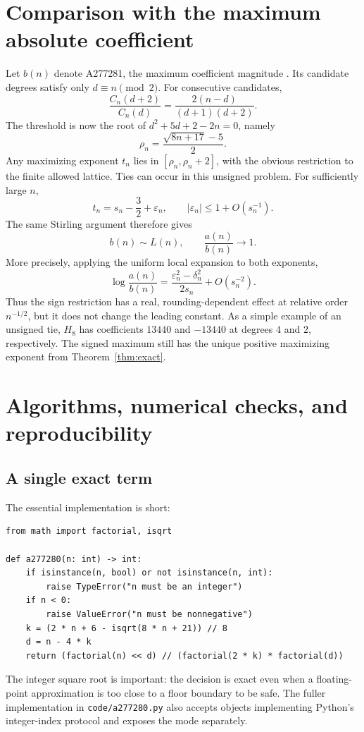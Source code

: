 \documentclass[11pt,letterpaper]{article}
\theoremstyle{remark}
\begin{document}
\section{Comparison with the maximum absolute coefficient}\label{sec:absolute}

Let $b(n)$ denote A277281, the maximum coefficient magnitude
\cite{oeis281}. Its candidate degrees satisfy only $d\equiv n\pmod2$.
For consecutive candidates,
\begin{equation}\label{eq:tworatio}
 \frac{C_n(d+2)}{C_n(d)}
 =\frac{2(n-d)}{(d+1)(d+2)}.
\end{equation}
The threshold is now the root of $d^2+5d+2-2n=0$, namely
\[
 \rho_n=\frac{\sqrt{8n+17}-5}{2}.
\]
Any maximizing exponent $t_n$ lies in $[\rho_n,\rho_n+2]$, with the obvious
restriction to the finite allowed lattice. Ties can occur in this unsigned
problem. For sufficiently large $n$,
\[
 t_n=s_n-\frac32+\varepsilon_n,\qquad
 |\varepsilon_n|\le1+O(s_n^{-1}).
\]
The same Stirling argument therefore gives
\begin{equation}\label{eq:unsigned}
 b(n)\sim L(n),\qquad
 \frac{a(n)}{b(n)}\longrightarrow1.
\end{equation}
More precisely, applying the uniform local expansion to both exponents,
\begin{equation}\label{eq:signedunsigned}
 \log\frac{a(n)}{b(n)}
 =\frac{\varepsilon_n^2-\delta_n^2}{2s_n}+O(s_n^{-2}).
\end{equation}
Thus the sign restriction has a real, rounding-dependent effect at relative
order $n^{-1/2}$, but it does not change the leading constant. As a simple
example of an unsigned tie, $H_8$ has coefficients $13440$ and $-13440$
at degrees $4$ and $2$, respectively. The signed maximum still has the
unique positive maximizing exponent from Theorem~\ref{thm:exact}.

\section{Algorithms, numerical checks, and reproducibility}\label{sec:computation}

\subsection{A single exact term}

The essential implementation is short:
\begin{lstlisting}
from math import factorial, isqrt

def a277280(n: int) -> int:
    if isinstance(n, bool) or not isinstance(n, int):
        raise TypeError("n must be an integer")
    if n < 0:
        raise ValueError("n must be nonnegative")
    k = (2 * n + 6 - isqrt(8 * n + 21)) // 8
    d = n - 4 * k
    return (factorial(n) << d) // (factorial(2 * k) * factorial(d))
\end{lstlisting}
The integer square root is important: the decision is exact even when a
floating-point approximation is too close to a floor boundary to be safe.
The fuller implementation in \texttt{code/a277280.py} also accepts objects
implementing Python's integer-index protocol and exposes the mode separately.
\end{document}
